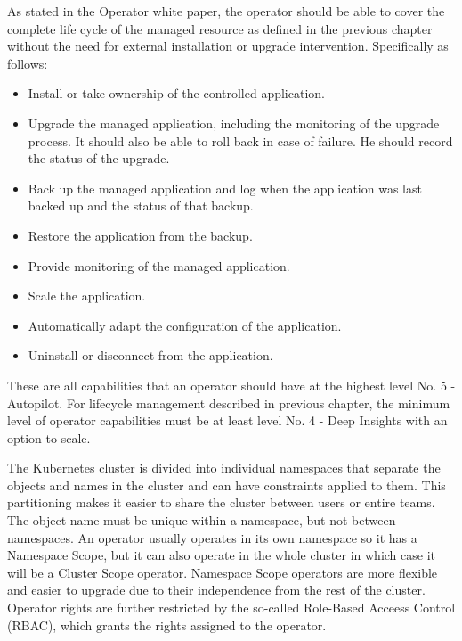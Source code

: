 
As stated in the Operator white paper, \cite{operatorWhitepaper} the operator should be able to cover the complete life cycle of the managed resource as defined in the previous chapter without the need for external installation or upgrade intervention. Specifically as follows:
\begin{itemize}
    \item Install or take ownership of the controlled application.
    \item Upgrade the managed application, including the monitoring of the upgrade process. It should also be able to roll back in case of failure. He should record the status of the upgrade.
    \item Back up the managed application and log when the application was last backed up and the status of that backup.
    \item Restore the application from the backup.
    \item Provide monitoring of the managed application.
    \item Scale the application.
    \item Automatically adapt the configuration of the application.
    \item Uninstall or disconnect from the application.
\end{itemize}

These are all capabilities that an operator should have at the highest level No. 5 - Autopilot. For lifecycle management described in previous chapter, the minimum level of operator capabilities must be at least level No. 4 - Deep Insights with an option to scale.

The Kubernetes cluster is divided into individual namespaces that separate the objects and names in the cluster and can have constraints applied to them. This partitioning makes it easier to share the cluster between users or entire teams. The object name must be unique within a namespace, but not between namespaces.  An operator usually operates in its own namespace so it has a Namespace Scope, but it can also operate in the whole cluster in which case it will be a Cluster Scope operator. Namespace Scope operators are more flexible and easier to upgrade due to their independence from the rest of the cluster. Operator rights are further restricted by the so-called Role-Based Acceess Control (RBAC), which grants the rights assigned to the operator. \cite{ operatorsAtK8sIface}

